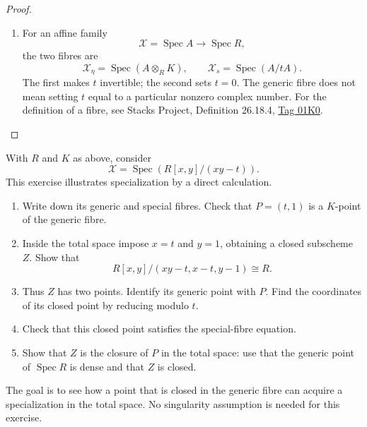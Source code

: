 \begin{proof}
\begin{enumerate}
\item For an affine family
$$
\mathcal{X}=\operatorname{Spec}A
\longrightarrow\operatorname{Spec}R,
$$
the two fibres are
$$
\mathcal{X}_{\eta}
=\operatorname{Spec}(A\otimes_R K),
\qquad
\mathcal{X}_s
=\operatorname{Spec}(A/tA).
$$
The first makes $t$ invertible; the
second sets $t=0$. The generic fibre
does not mean setting $t$ equal to
a particular nonzero complex number.
For the definition of a fibre, see
Stacks Project, Definition 26.18.4,
\href{https://stacks.math.columbia.edu/tag/%
01K0}{Tag 01K0}.
\end{enumerate}
\end{proof}

\begin{exercise}
\label{exercise-follow-point-to-fibre}
With $R$ and $K$ as above, consider
$$
\mathcal{X}
=\operatorname{Spec}(R[x,y]/(xy-t)).
$$
This exercise illustrates specialization
by a direct calculation.
\begin{enumerate}
\item Write down its generic and special
fibres. Check that $P=(t,1)$ is a
$K$-point of the generic fibre.
\item Inside the total space impose
$x=t$ and $y=1$, obtaining a closed
subscheme $Z$. Show that
$$
R[x,y]/(xy-t,x-t,y-1)\cong R.
$$
\item Thus $Z$ has two points. Identify
its generic point with $P$. Find the
coordinates of its closed point by
reducing modulo $t$.
\item Check that this closed point
satisfies the special-fibre equation.
\item Show that $Z$ is the closure of
$P$ in the total space: use that the
generic point of $\operatorname{Spec}R$
is dense and that $Z$ is closed.
\end{enumerate}
The goal is to see how a point that is
closed in the generic fibre can acquire
a specialization in the total space.
No singularity assumption is needed
for this exercise.
\end{exercise}

